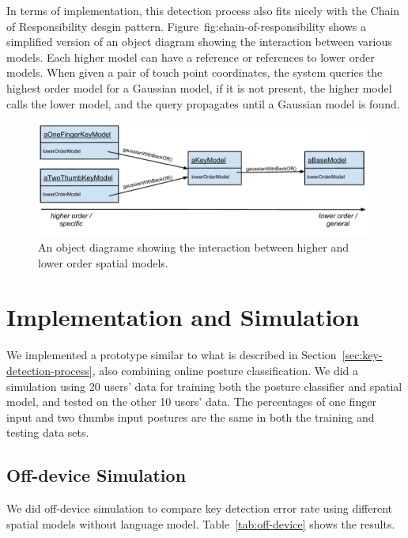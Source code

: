 \documentclass{sigchi}
\begin{document}
In terms of implementation, this detection process also fits nicely with the
Chain of Responsibility desgin pattern.
Figure~{fig:chain-of-responsibility} shows a simplified version of an object
diagram showing the interaction between various models. Each higher model can
have a reference or references to lower order models. When given a pair of touch
point coordinates, the system queries the highest order model for a Gaussian
model, if it is not present, the higher model calls the lower model, and the
query propagates until a Gaussian model is found.

\begin{figure}[tb]
  \centering
  \includegraphics[width=1\columnwidth]{figures/chain-of-responsibility.pdf}
  \caption{An object diagrame showing the interaction between higher and lower
  order spatial models.}
  \label{fig:chain-of-reponsibility}
\end{figure}

\section{Implementation and Simulation}
We implemented a prototype similar to what is described in
Section~\ref{sec:key-detection-process}, also combining online posture
classification. We did a simulation using 20 users' data for training
both the posture classifier and spatial model, and tested on the other 10 users' 
data. The percentages of one finger input and two thumbs input postures are the same in both the training and testing data sets.

\subsection{Off-device Simulation}
We did off-device simulation to compare
key detection error rate using different spatial models without language model.
Table~\ref{tab:off-device} shows the results.
\end{document}
